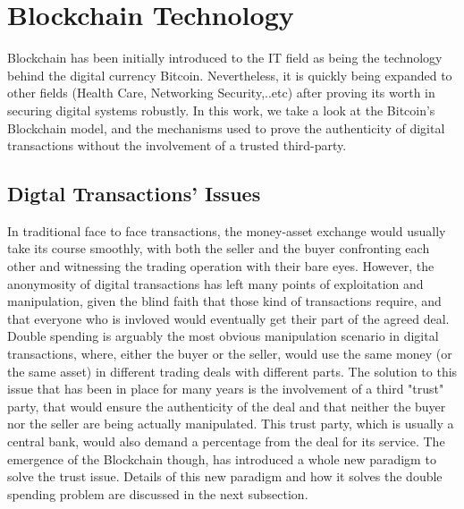 \section{Blockchain Technology}
Blockchain has been initially introduced to the IT field as being the technology behind the digital currency Bitcoin. Nevertheless,  it is quickly being expanded to other fields (Health Care, Networking Security,..etc) after proving its worth in securing digital systems robustly. In this work, we take a look at the Bitcoin's Blockchain model,  and the mechanisms used to prove the authenticity of digital transactions without the involvement of a trusted third-party.
\subsection{Digtal Transactions' Issues \cite{satoshi}}
In traditional face to face transactions, the money-asset exchange would usually take its course smoothly, with both the seller and the buyer confronting each other and witnessing the trading operation with their bare eyes. However, the anonymosity of digital transactions has left many points of exploitation and manipulation, given the blind faith that those kind of transactions require, and that everyone who is invloved would eventually get their part of the agreed deal. Double spending is arguably the most obvious manipulation scenario in digital transactions, where, either the buyer or the seller, would use the same money (or the same asset) in different trading deals with different parts. The solution to this issue that has been in place for many years is the involvement of a third "trust" party, that would ensure the authenticity of the deal and that neither the buyer nor the seller are being actually manipulated. This trust party, which is usually a central bank, would also demand a percentage from the deal for its service. The emergence of the Blockchain though, has introduced a whole new paradigm to solve the trust issue. Details of this new paradigm and how it solves the double spending problem are discussed in the next subsection.

